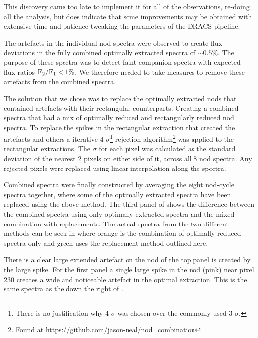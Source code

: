 This discovery came too late to implement it for all of the observations, re-doing all the analysis, but does indicate that some improvements may be obtained with extensive time and patience tweaking the parameters of the {DRACS} pipeline.


The artefacts in the individual nod spectra were observed to create flux deviations in the fully combined optimally extracted spectra of \(\sim 0.5\%\). The purpose of these spectra was to detect faint companion spectra with expected flux ratios \(\rm {F_2}/{F_1} < 1\%\). We therefore needed to take measures to remove these artefacts from the combined spectra.

The solution that we chose was to replace the optimally extracted nods that contained artefacts with their rectangular counterparts. Creating a combined spectra that had a mix of optimally reduced and rectangularly reduced nod spectra.
To replace the spikes in the rectangular extraction that created the artefacts and others a iterative 4-\(\sigma\)\footnote{There is no justification why 4-\(\sigma\) was chosen over the commonly used 3-\(\sigma\).} rejection algorithm\footnote{Found at \url{https://github.com/jason-neal/nod_combination}} was applied to the rectangular extractions. The \(\sigma\) for each pixel was calculated as the standard deviation of the nearest 2 pixels on either side of it, across all 8 nod spectra. Any rejected pixels were replaced using linear interpolation along the spectra.


Combined spectra were finally constructed by averaging the eight nod-cycle spectra together, where some of the optimally extracted spectra have been replaced using the above method. The third panel of  shows the difference between the combined spectra using only optimally extracted spectra and the mixed combination with replacements. The actual spectra from the two different methods can be seen in  where orange is the combination of optimally reduced spectra only and green uses the replacement method outlined here.

There is a clear large extended artefact on the  nod of the top panel is created by the large spike. For the first panel a single large spike in the  nod (pink) near pixel 230 creates a wide and noticeable artefact in the optimal extraction. This is the same spectra as the  down the right of .



